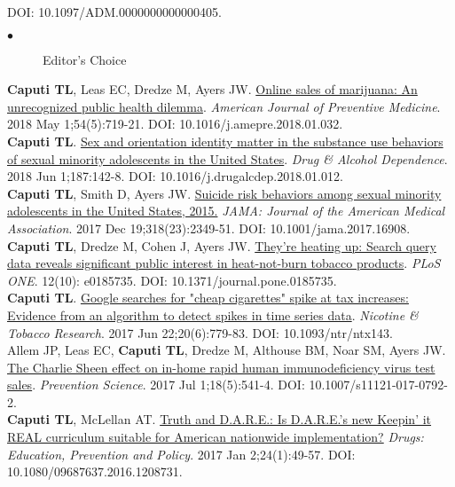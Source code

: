 \documentclass[11pt, letterpaper]{article}
\newcommand{\years}[1]{\marginnote{\normalsize #1}}
\begin{document}
DOI: 10.1097/ADM.0000000000000405.
    \begin{description}
    \item[$\bullet$] Editor's Choice
    \end{description}
\years{2018}\textbf{Caputi TL}, Leas EC, Dredze M, Ayers JW.
\href{http://dx.doi.org/10.1016/j.amepre.2018.01.032}{Online sales of marijuana: An unrecognized public health dilemma}. \textit{American Journal of Preventive Medicine}. 2018 May 1;54(5):719-21. DOI: 10.1016/j.amepre.2018.01.032.\\[.2cm]
\years{2018}\textbf{Caputi TL}. \href{https://doi.org/10.1016/j.drugalcdep.2018.01.012
}{Sex and orientation identity matter in the substance use behaviors of sexual minority adolescents in the United States}. \emph{Drug \& Alcohol Dependence}. 2018 Jun 1;187:142-8. DOI: 10.1016/j.drugalcdep.2018.01.012.
\\[.2cm]
\years{2017}\textbf{Caputi TL}, Smith D, Ayers JW.
\href{http://dx.doi.org/10.1001/jama.2017.16908}{Suicide risk behaviors among sexual minority adolescents in the United States, 2015.} \emph{JAMA: Journal of the American Medical Association}.  2017 Dec 19;318(23):2349-51. DOI: 10.1001/jama.2017.16908.\\[.2cm]
\clearpage
\years{2017}\textbf{Caputi TL}, Dredze M, Cohen J, Ayers JW. \href{http://dx.doi.org/10.1371/journal.pone.0185735}{They’re heating up: Search query data reveals significant public interest in heat-not-burn tobacco products}. \emph{PLoS ONE}. 12(10): e0185735. DOI: 10.1371/journal.pone.0185735.\\[.2cm]
\years{2017}\textbf{Caputi TL}.  \href{http://dx.doi.org/10.1093/ntr/ntx143}{Google searches for "cheap cigarettes" spike at tax increases: Evidence from an algorithm to detect spikes in time series data}. \emph{Nicotine \& Tobacco Research}. 2017 Jun 22;20(6):779-83. DOI: 10.1093/ntr/ntx143.\\[.2cm]
\years{2017}Allem JP, Leas EC, \textbf{Caputi TL}, Dredze M, Althouse BM, Noar SM, Ayers JW. \href{http://dx.doi.org/10.1007/s11121-017-0792-2}{The Charlie Sheen effect on in-home rapid human immunodeficiency virus test sales}. \textit{Prevention Science}. 2017 Jul 1;18(5):541-4. DOI:  10.1007/s11121-017-0792-2.\\[.2cm]
\years{2017}\textbf{Caputi TL}, McLellan AT. \href{http://dx.doi.org/10.1080/09687637.2016.1208731}{Truth and D.A.R.E.: Is D.A.R.E.’s new Keepin’ it REAL curriculum suitable for American nationwide implementation?}  \textit{Drugs: Education, Prevention and Policy}. 2017 Jan 2;24(1):49-57. DOI: 10.1080/09687637.2016.1208731.
\end{document}
